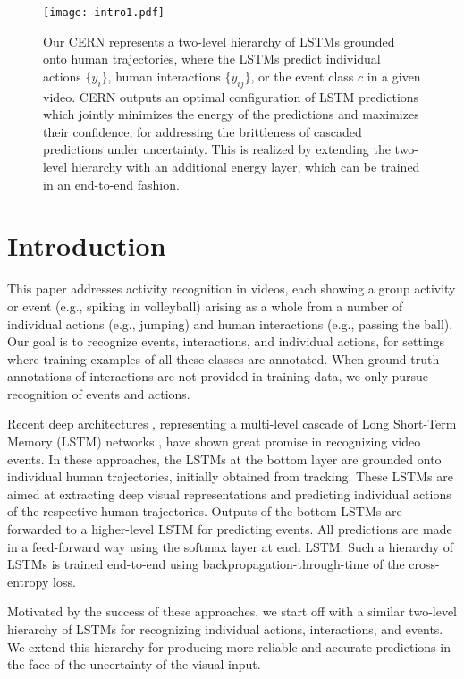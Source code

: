 \documentclass[10pt,twocolumn,letterpaper]{article}
\begin{document}
 \begin{figure}[t!]
      \centering
      \texttt{[image: intro1.pdf]}
      \caption{Our CERN represents a two-level hierarchy of LSTMs grounded onto human trajectories, where the LSTMs predict individual actions $\{y_i\}$, human interactions $\{y_{ij}\}$, or the event class $c$ in a given video. CERN outputs an optimal configuration of LSTM predictions which jointly minimizes the energy of the predictions and maximizes their confidence, for addressing the brittleness of cascaded predictions under uncertainty. This is realized by extending the two-level hierarchy with an additional energy layer, which can be trained in an end-to-end fashion.}
      \label{fig:intro}
   \end{figure}

\section{Introduction}
   
This paper addresses activity recognition in videos, each showing a group activity or event (e.g., spiking in volleyball) arising as a whole from a number of individual actions (e.g., jumping) and human interactions (e.g., passing the ball). Our goal is to recognize events, interactions, and individual actions, for settings where training examples of all these classes are annotated. When ground truth annotations of interactions are not provided in training data, we only pursue recognition of events and actions.

Recent deep architectures \cite{Ibrahim2016, Ramanathan2016}, representing a multi-level cascade of Long Short-Term Memory (LSTM) networks \cite{Hochreiter1997}, have shown great promise in recognizing video events. In these approaches, the LSTMs at the bottom layer are grounded onto individual human trajectories, initially obtained from tracking. These LSTMs are aimed at extracting deep visual representations and predicting individual actions of the respective human trajectories. Outputs of the bottom LSTMs are forwarded to a higher-level LSTM for predicting events. All predictions are made in a feed-forward way using the softmax layer at each LSTM. Such a hierarchy of LSTMs is trained end-to-end using backpropagation-through-time of the cross-entropy loss. 

Motivated by the success of these approaches, we start off with a similar two-level hierarchy of LSTMs for recognizing individual actions, interactions, and events. We extend this hierarchy for producing more reliable and accurate predictions in the face of the uncertainty of the visual input.   
\end{document}
